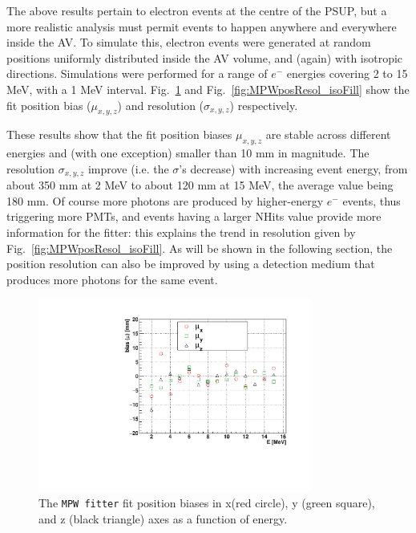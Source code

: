 The above results pertain to electron events at the centre of the PSUP, but a more realistic analysis must permit events to happen anywhere and everywhere inside the AV. To simulate this, electron events were generated at random positions uniformly distributed inside the AV volume, and (again) with isotropic directions. Simulations were performed for a range of $e^-$ energies covering 2 to 15 MeV, with a 1 MeV interval. Fig.~\ref{fig:MPWposBias_isoFill} and Fig.~\ref{fig:MPWposResol_isoFill} show the fit position bias ($\mu_{x,y,z}$) and resolution ($\sigma_{x,y,z}$) respectively. 

These results show that the fit position biases $\mu_{x,y,z}$ are stable across different energies and (with one exception) smaller than 10 mm in magnitude. The resolution $\sigma_{x,y,z}$ improve (i.e. the $\sigma$'s decrease) with increasing event energy, from about 350 mm at 2 MeV to about 120 mm at 15 MeV, the average value being 180 mm. Of course more photons are produced by higher-energy $e^-$ events, thus triggering more PMTs, and events having a larger NHits value provide more information for the fitter: this explains the trend in resolution given by Fig.~\ref{fig:MPWposResol_isoFill}. As will be shown in the following section, the position resolution can also be improved by using a detection medium that produces more photons for the same event. 

\begin{figure}[htbp]
	\centering	
	\includegraphics[width=9cm]{MPW_isoFill_posBiasVsE.pdf}
	\caption[The \texttt{MPW fitter} fit position biases ($\mu_{x,y,z}$) as a function of energy.]{The \texttt{MPW fitter} fit position biases in x(red circle), y (green square), and z (black triangle) axes as a function of energy. \label{fig:MPWposBias_isoFill}}
\end{figure}

